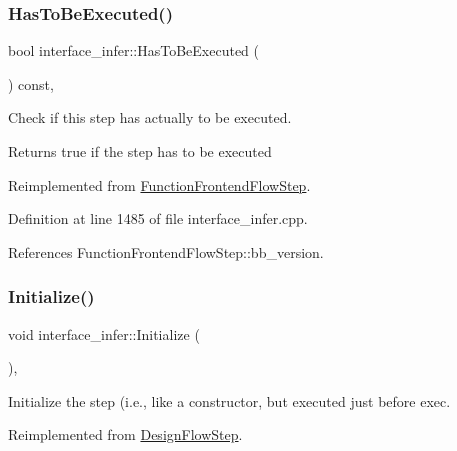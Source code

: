 \subsubsection{\texorpdfstring{Has\+To\+Be\+Executed()}{HasToBeExecuted()}}
{\footnotesize\ttfamily bool interface\+\_\+infer\+::\+Has\+To\+Be\+Executed (\begin{DoxyParamCaption}{ }\end{DoxyParamCaption}) const\hspace{0.3cm}{\ttfamily [override]}, {\ttfamily [virtual]}}



Check if this step has actually to be executed. 

\begin{DoxyReturn}{Returns}
true if the step has to be executed 
\end{DoxyReturn}


Reimplemented from \hyperlink{classFunctionFrontendFlowStep_a12e786363530aa9533e4bd9380130d75}{Function\+Frontend\+Flow\+Step}.



Definition at line 1485 of file interface\+\_\+infer.\+cpp.



References Function\+Frontend\+Flow\+Step\+::bb\+\_\+version.

\mbox{\label{classinterface__infer_a6d0b5cf326bca201100be4cb19f1a588}} 
\subsubsection{\texorpdfstring{Initialize()}{Initialize()}}
{\footnotesize\ttfamily void interface\+\_\+infer\+::\+Initialize (\begin{DoxyParamCaption}{ }\end{DoxyParamCaption})\hspace{0.3cm}{\ttfamily [override]}, {\ttfamily [virtual]}}



Initialize the step (i.\+e., like a constructor, but executed just before exec. 



Reimplemented from \hyperlink{classDesignFlowStep_a44b50683382a094976e1d432a7784799}{Design\+Flow\+Step}.



